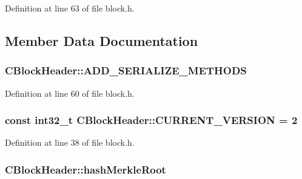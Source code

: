 Definition at line 63 of file block.\+h.



\subsection{Member Data Documentation}
\hypertarget{class_c_block_header_abddc9307695fbe6bd9bb1a7f48d38011}{}
\subsubsection[{A\+D\+D\+\_\+\+S\+E\+R\+I\+A\+L\+I\+Z\+E\+\_\+\+M\+E\+T\+H\+O\+D\+S}]{\setlength{\rightskip}{0pt plus 5cm}C\+Block\+Header\+::\+A\+D\+D\+\_\+\+S\+E\+R\+I\+A\+L\+I\+Z\+E\+\_\+\+M\+E\+T\+H\+O\+D\+S}\label{class_c_block_header_abddc9307695fbe6bd9bb1a7f48d38011}


Definition at line 60 of file block.\+h.

\hypertarget{class_c_block_header_a1da5740e22d124df509383a1ff96eb7c}{}
\subsubsection[{C\+U\+R\+R\+E\+N\+T\+\_\+\+V\+E\+R\+S\+I\+O\+N}]{\setlength{\rightskip}{0pt plus 5cm}const {\bf int32\+\_\+t} C\+Block\+Header\+::\+C\+U\+R\+R\+E\+N\+T\+\_\+\+V\+E\+R\+S\+I\+O\+N = 2\hspace{0.3cm}{\ttfamily [static]}}\label{class_c_block_header_a1da5740e22d124df509383a1ff96eb7c}


Definition at line 38 of file block.\+h.

\hypertarget{class_c_block_header_ae9ef013abbcfbd9f8bc23dbcda0fd5af}{}
\subsubsection[{hash\+Merkle\+Root}]{ C\+Block\+Header\+::hash\+Merkle\+Root}\label{class_c_block_header_ae9ef013abbcfbd9f8bc23dbcda0fd5af}


